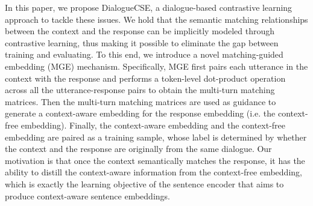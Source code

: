 \documentclass[11pt]{article}
\begin{document}
In this paper, we propose DialogueCSE, a dialogue-based contrastive learning approach to tackle these issues.
We hold that the semantic matching relationships between the context and the response can be implicitly modeled through contrastive learning, thus making it possible to eliminate the gap between training and evaluating.
To this end, we introduce a novel matching-guided embedding (MGE) mechanism.
Specifically, MGE first pairs each utterance in the context with the response and performs a token-level dot-product operation across all the utterance-response pairs to obtain the multi-turn matching matrices.
Then the multi-turn matching matrices are used as guidance to generate a context-aware embedding for the response embedding (i.e. the context-free embedding).
Finally, the context-aware embedding and the context-free embedding are paired as a training sample, whose label is determined by whether the context and the response are originally from the same dialogue.
Our motivation is that once the context semantically matches the response, it has the ability to distill the context-aware information from the context-free embedding, which is exactly the learning objective of the sentence encoder that aims to produce context-aware sentence embeddings.
\end{document}
